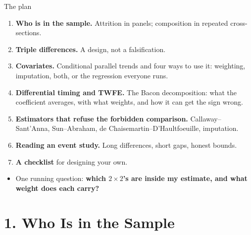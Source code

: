 \documentclass[
  11pt,
  ignorenonframetext,
  aspectratio=169,
]{beamer}
\providecommand{\tightlist}{%
  \setlength{\itemsep}{0pt}\setlength{\parskip}{0pt}}
\begin{document}
\begin{frame}{The plan}
\protect{}\label{the-plan}
\begin{enumerate}
\tightlist
\item
  \textbf{Who is in the sample.} Attrition in panels; composition in
  repeated cross-sections.
\item
  \textbf{Triple differences.} A design, not a falsification.
\item
  \textbf{Covariates.} Conditional parallel trends and four ways to use
  it: weighting, imputation, both, or the regression everyone runs.
\item
  \textbf{Differential timing and TWFE.} The Bacon decomposition: what
  the coefficient averages, with what weights, and how it can get the
  sign wrong.
\item
  \textbf{Estimators that refuse the forbidden comparison.}
  Callaway--Sant'Anna, Sun--Abraham, de Chaisemartin--D'Haultfoeuille,
  imputation.
\item
  \textbf{Reading an event study.} Long differences, short gaps, honest
  bounds.
\item
  \textbf{A checklist} for designing your own.
\end{enumerate}

\vspace{0.4em}

\begin{itemize}
\tightlist
\item
  One running question: \textbf{which \(2 \times 2\)'s are inside my
  estimate, and what weight does each carry?}
\end{itemize}
\end{frame}

\section{1. Who Is in the Sample}\label{who-is-in-the-sample}
\end{document}
